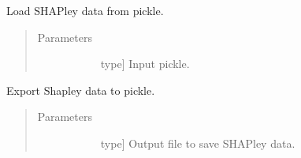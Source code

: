 \documentclass[letterpaper,10pt,english]{sphinxmanual}
\begin{document}
\begin{fulllineitems}
\begin{fulllineitems}
\label{\detokenize{index:methylnet.interpretation_classes.ShapleyData.from_pickle}}
Load SHAPley data from pickle.
\begin{quote}\begin{description}
\item[{Parameters}] \leavevmode\begin{description}
\item[{}] \leavevmode{[}type{]}
Input pickle.

\end{description}

\end{description}\end{quote}

\end{fulllineitems}


\begin{fulllineitems}
\label{\detokenize{index:methylnet.interpretation_classes.ShapleyData.to_pickle}}
Export Shapley data to pickle.
\begin{quote}\begin{description}
\item[{Parameters}] \leavevmode\begin{description}
\item[{}] \leavevmode{[}type{]}
Output file to save SHAPley data.

\end{description}

\end{description}\end{quote}

\end{fulllineitems}


\end{fulllineitems}

\end{document}
